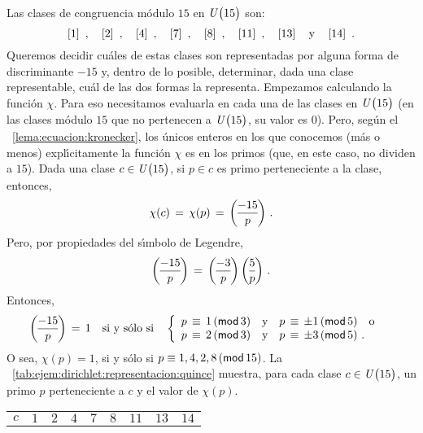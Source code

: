 \begin{ejemDirichlet}\label{ejem:dirichlet:representacion:quince}
	Las clases de congruencia m\'odulo $15$ en
	$\Unidadesmod[15]$ son:
	\begin{displaymath}
		\clase 1\dispcomma\quad
		\clase 2\dispcomma\quad
		\clase 4\dispcomma\quad
		\clase 7\dispcomma\quad
		\clase 8\dispcomma\quad
		\clase{11}\dispcomma\quad
		\clase{13}\dispand
		\clase{14}\dispstop
	\end{displaymath}
	Queremos decidir cu\'ales de estas clases son representadas
	por alguna forma de discriminante $-15$ y, dentro de lo posible,
	determinar, dada una clase representable, cu\'al de las dos formas
	la representa. Empezamos calculando la funci\'on $\chi$.
	Para eso necesitamos evaluarla en cada una de las clases en
	$\Unidadesmod[15]$ (en las clases m\'odulo $15$ que no
	pertenecen a $\Unidadesmod[15]$, su valor es $0$).
	Pero, seg\'un el \lemaname~\ref{lema:ecuacion:kronecker},
	los \'unicos enteros en los que conocemos (m\'as o menos)
	expl\'{\i}citamente la funci\'on $\chi$ es en los primos (que,
	en este caso, no dividen a $15$).
	Dada una clase $c\in\Unidadesmod[15]$, si $p\in c$
	es primo perteneciente a la clase, entonces,
	\begin{displaymath}
		\chi(c)\,=\,\chi(p)\,=\,\legendre{-15} p
		\dispstop
	\end{displaymath}
	Pero, por propiedades del s\'{\i}mbolo de Legendre,
	\begin{displaymath}
		\legendre{-15} p\,=\,\legendre{-3} p\,\legendre 5 p
		\dispstop
	\end{displaymath}
	Entonces,
	\begin{displaymath}
		\legendre{-15} p\,=\,1
		\dispiff
		\left\{
			\begin{array}{l}
				p\,\equiv\,1\tmodulo[3]\dispand
					p\,\equiv\,\pm 1\tmodulo[5]
					\dispor \\
				p\,\equiv\,2\tmodulo[3]\dispand
					p\,\equiv\,\pm 3\tmodulo[5]
					\dispstop
			\end{array}
		\right.
	\end{displaymath}
	O sea, $\chi(p)=1$, si y s\'olo si
	$p\equiv 1,4,2,8\tmodulo[15]$.
	La \tablename~\ref{tab:ejem:dirichlet:representacion:quince}
	muestra, para cada clase $c\in\Unidadesmod[15]$, un primo $p$
	perteneciente a $c$ y el valor de $\chi(p)$.
	\begin{table}
		\centering
		\begin{tabular}{r|cccccccc}
			$c$ & $1$ & $2$ & $4$ & $7$
				& $8$ & $11$ & $13$ & $14$ \\

\end{tabular}
\end{table}
\end{ejemDirichlet}
